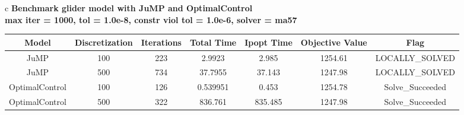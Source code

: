 \documentclass{standalone}
\begin{document}
\begin{tabular}{c}
\hline
\Large\textbf{Benchmark glider model with JuMP and OptimalControl}\\
\large\textbf{max iter = 1000, tol = 1.0e-8, constr viol tol = 1.0e-6, solver = ma57}\\
\begin{tabular}{ccccccc}
  \hline
  \textbf{Model} & \textbf{Discretization} & \textbf{Iterations} & \textbf{Total Time} & \textbf{Ipopt Time} & \textbf{Objective Value} & \textbf{Flag} \\\hline
  JuMP & 100 & 223 & 2.9923 & 2.985 & 1254.61 & LOCALLY\_SOLVED \\
  JuMP & 500 & 734 & 37.7955 & 37.143 & 1247.98 & LOCALLY\_SOLVED \\
  OptimalControl & 100 & 126 & 0.539951 & 0.453 & 1254.78 & Solve\_Succeeded \\
  OptimalControl & 500 & 322 & 836.761 & 835.485 & 1247.98 & Solve\_Succeeded \\\hline
\end{tabular}
\end{tabular}
\end{document}
